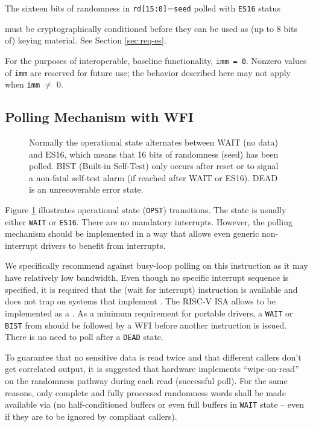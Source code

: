     The sixteen bits of randomness in \verb|rd[15:0]|=\verb|seed| polled
    with \verb|ES16| status {must be cryptographically conditioned
    before they can be used as (up to 8 bits of) keying material.
    See Section \ref{sec:req-es}.

    For the purposes of interoperable, baseline functionality, \verb|imm = 0|.
    Nonzero values of \verb|imm| are reserved for future use; the behavior
    described here may not apply when \verb|imm| $\neq$ 0.


\subsection{Polling Mechanism with WFI}
\label{sec:es-polling}

\begin{figure}[tb]
    \centering
    
    \caption{Normally the operational state alternates between WAIT
        (no data) and ES16, which means that 16 bits of randomness (seed)
        has been polled. BIST (Built-in Self-Test) only occurs after reset
        or to signal a non-fatal self-test alarm (if reached after WAIT or 
        ES16). DEAD is an unrecoverable error state.}
    \label{fig:esstate_tikz}
\end{figure}

    Figure \ref{fig:esstate_tikz} illustrates operational state
    (\verb|OPST|) transitions. The state is usually either \verb|WAIT| or 
    \verb|ES16|. There are no mandatory interrupts. However, the polling
    mechanism should be implemented in a way that allows even generic
    non-interrupt drivers to benefit from interrupts.

    We specifically recommend against busy-loop polling on this instruction
    as it may have relatively low bandwidth. Even though no specific interrupt
    sequence is specified, it is required that the  (wait for
    interrupt) instruction is available and does not trap on systems that
    implement . The RISC-V ISA allows  to be
    implemented as a .
    As a minimum requirement for portable drivers, a \verb|WAIT| or
    \verb|BIST| from  should be followed by a WFI before
    another  instruction is issued. There is
    no need to poll after a \verb|DEAD| state.

    To guarantee that no sensitive data is read twice and that different
    callers don't get correlated output, it is suggested that hardware
    implements ``wipe-on-read'' on the randomness pathway during each read
    (successful poll). For the same reasons, only complete and fully
    processed randomness words shall be made available via
     (no half-conditioned buffers or even full buffers
    in \verb|WAIT| state -- even if they are to be ignored by compliant
    callers).

}
